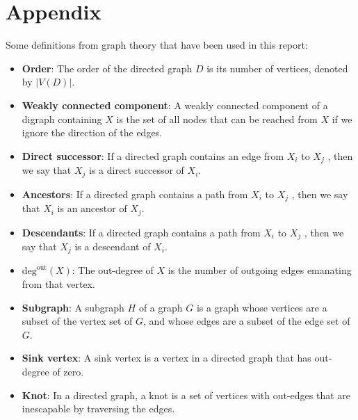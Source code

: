\documentclass{article}
\begin{document}



\section*{Appendix}
Some definitions from graph theory that have been used in this report:

\begin{itemize}
  \item \textbf{Order}: The order of the directed graph $D$ is its number of vertices, denoted by $\left| V(D) \right|$.
  \item \textbf{Weakly connected component}: A weakly connected component of a digraph containing $X$ is the set of all nodes that can be reached from $X$ if we ignore the direction of the edges.
  \item \textbf{Direct successor}: If a directed graph contains an edge from $X_i$ to $X_j$ , then we say that $X_j$ is a direct successor of $X_i$.
  \item \textbf{Ancestors}: If a directed graph contains a path from $X_i$ to $X_j$ , then we say that $X_i$ is an ancestor of $X_j$.
  \item \textbf{Descendants}: If a directed graph contains a path from $X_i$ to $X_j$ , then we say that $X_j$ is a descendant of $X_i$.
  \item \textbf{$\text{deg}^{\text{out}}(X)$}: The out-degree of $X$ is the number of outgoing edges emanating from that vertex.
  \item \textbf{Subgraph}: A subgraph $H$ of a graph $G$ is a graph whose vertices are a subset of the vertex set of $G$, and whose edges are a subset of the edge set of $G$.
  \item \textbf{Sink vertex}: A sink vertex is a vertex in a directed graph that has out-degree of zero.
  \item \textbf{Knot}: In a directed graph, a knot is a set of vertices with out-edges that are inescapable by traversing the edges.
\end{itemize}
\end{document}
